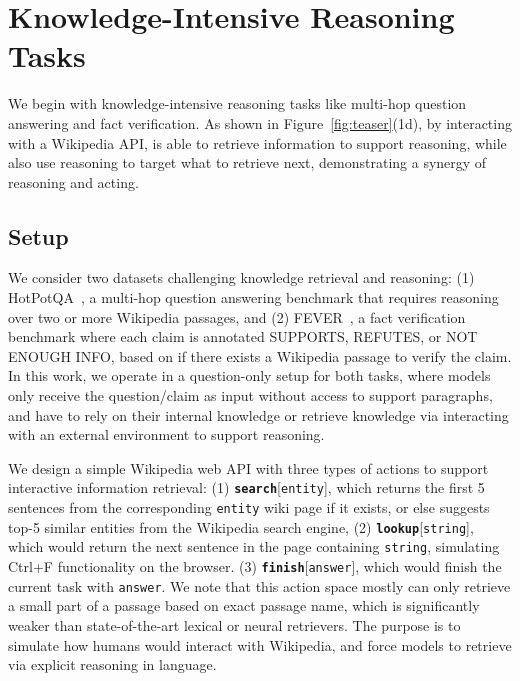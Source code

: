 \section{Knowledge-Intensive Reasoning Tasks}
\label{sec:knowledge}
We begin with knowledge-intensive reasoning tasks like multi-hop question answering and fact verification.
As shown in Figure~\ref{fig:teaser}(1d), by interacting with a Wikipedia API, \model{} is able to retrieve information to support reasoning, while also use reasoning to target what to retrieve next, demonstrating a synergy of reasoning and acting.




\subsection{Setup}



 We consider two datasets challenging knowledge retrieval and reasoning: (1) HotPotQA~\citep{yang2018hotpotqa}, a multi-hop question answering benchmark that requires reasoning over two or more Wikipedia passages, and
(2) FEVER~\citep{thorne2018fever}, a fact verification benchmark where each claim is annotated SUPPORTS, REFUTES, or NOT ENOUGH INFO, based on if there exists a Wikipedia passage to verify the claim.
In this work, we operate in a question-only setup for both tasks, where models only receive the question/claim as input without access to support paragraphs, and have to rely on their internal knowledge or retrieve knowledge via interacting with an external environment to support reasoning.

 We design a simple Wikipedia web API with three types of actions to support interactive information retrieval: 
(1) \textbf{\texttt{search}}[\texttt{entity}], which returns the first 5 sentences from the corresponding \texttt{entity} wiki page if it exists, or else suggests top-5 similar entities from the Wikipedia search engine, 
(2) \textbf{\texttt{lookup}}[\texttt{string}], which would return the next sentence in the page containing \texttt{string}, simulating Ctrl+F functionality on the browser. 
(3) \textbf{\texttt{finish}}[\texttt{answer}], which would finish the current task with \texttt{answer}.
We note that this action space mostly can only retrieve a small part of a passage based on exact passage name, which is significantly weaker than state-of-the-art lexical or neural retrievers. The purpose is to simulate how humans would interact with Wikipedia, and force models to retrieve via explicit reasoning in language.


